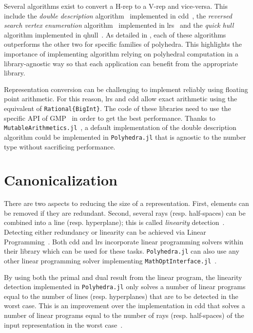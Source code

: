 \documentclass{juliacon}
\newcommand{\Vrep}{V-rep}
\newcommand{\hrep}{H-rep}
\newcommand{\jlpkg}[1]{\texttt{#1.jl}}
\begin{document}
Several algorithms exist to convert a \hrep{} to a \Vrep{} and vice-versa.
This include the \emph{double description} algorithm~\cite{motzkin1953double,fukuda1996double} implemented in cdd~\cite{fukuda2003cdd},
the \emph{reversed search vertex enumeration} algorithm~\cite{avis1996reverse} implemented in lrs~\cite{avis1994ac,avis2000revised} and
the \emph{quick hull} algorithm implemented in qhull~\cite{barber1996quickhull}.
As detailed in \cite{avis1995good}, each of these algorithms outperforms the other two for specific families of polyhedra.
This highlights the importance of implementing algorithm relying on polyhedral computation in a library-agnostic way
so that each application can benefit from the appropriate library.


Representation conversion can be challenging to implement reliably using floating point arithmetic.
For this reason, lrs and cdd allow exact arithmetic using the equivalent of \texttt{Rational\{BigInt\}}.
The code of these libraries need to use the specific API of GMP~\cite{granlund1996gnu} in order to get the best performance.
Thanks to \jlpkg{MutableArithmetics}~\cite{Legat2024},
a default implementation of the double description algorithm could be implemented
in \jlpkg{Polyhedra} that is agnostic to the number type without sacrificing performance.

\section{Canonicalization}

There are two aspects to reducing the size of a representation.
First, elements can be removed if they are redundant.
Second, several rays (resp. half-spaces) can be combined
into a line (resp. hyperplane);
this is called \emph{linearity} detection~\cite{avis2002canonical}.
Detecting either redundancy or linearity can be
achieved via Linear Programming~\cite{avis2000revised}.
Both cdd and lrs incorporate linear programming solvers within
their library which can be used for these tasks.
\jlpkg{Polyhedra} can also use any other linear programming solver
implementing \jlpkg{MathOptInterface}~\cite{legat2021mathoptinterface}.

By using both the primal and dual result from the linear program,
the linearity detection implemented in \jlpkg{Polyhedra}
only solves a number of linear programs equal to the
number of lines (resp. hyperplanes) that are to be detected in the worst case.
This is an improvement over the implementation in cdd
that solves a number of linear programs equal to the number
of rays (resp. half-spaces) of the input representation in the worst case~\cite[Remark~1.3.1]{legat2020set}.
\end{document}
